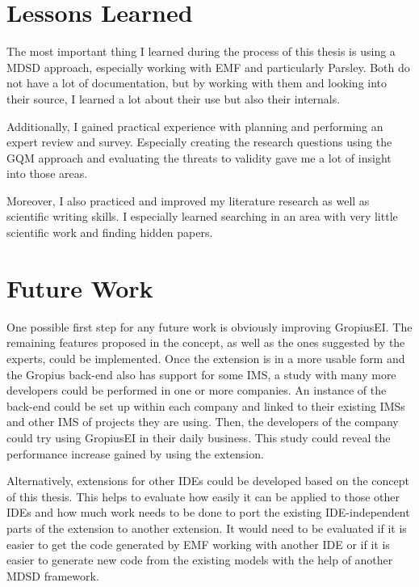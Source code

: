 \section{Lessons Learned}
\label{sec:ch6:s4}
The most important thing I learned during the process of this thesis is using a \gls{MDSD} approach, especially working with \gls{EMF} and particularly \gls{Parsley}.
Both do not have a lot of documentation, but by working with them and looking into their source, I learned a lot about their use but also their internals.

Additionally, I gained practical experience with planning and performing an expert review and survey.
Especially creating the research questions using the \gls{GQM} approach and evaluating the threats to validity gave me a lot of insight into those areas.

Moreover, I also practiced and improved my literature research as well as scientific writing skills.
I especially learned searching in an area with very little scientific work and finding hidden papers.

\section{Future Work}
\label{sec:ch6:s5}
One possible first step for any future work is obviously improving \gls{GropiusEI}.
The remaining features proposed in the concept, as well as the ones suggested by the experts, could be implemented.
Once the extension is in a more usable form and the \gls{Gropius} back-end also has support for some \gls{IMS},
a study with many more developers could be performed in one or more companies.
An instance of the back-end could be set up within each company and linked to their existing \glspl{IMS} and other \gls{IMS} of projects they are using.
Then, the developers of the company could try using \gls{GropiusEI} in their daily business.
This study could reveal the performance increase gained by using the extension.

Alternatively, extensions for other \glspl{IDE} could be developed based on the concept of this thesis.
This helps to evaluate how easily it can be applied to those other \glspl{IDE} and how much work needs to be done to port the existing \gls{IDE}-independent parts of the extension to another extension.
It would need to be evaluated if it is easier to get the code generated by \gls{EMF} working with another \gls{IDE} or if it is easier to generate new code from the existing models with the help of another \gls{MDSD} framework. 